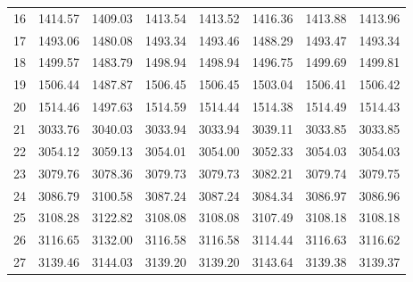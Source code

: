 \documentclass[10pt,oneside]{article}
\begin{document}
\begin{table}[h!]
\begin{tabular}{cccccccc}
16 &   1414.57 & 1409.03 & 1413.54 & 1413.52 &      1416.36 & 1413.88 & 1413.96 \\
17 &   1493.06 & 1480.08 & 1493.34 & 1493.46 &      1488.29 & 1493.47 & 1493.34 \\
18 &   1499.57 & 1483.79 & 1498.94 & 1498.94 &      1496.75 & 1499.69 & 1499.81 \\
19 &   1506.44 & 1487.87 & 1506.45 & 1506.45 &      1503.04 & 1506.41 & 1506.42 \\
20 &   1514.46 & 1497.63 & 1514.59 & 1514.44 &      1514.38 & 1514.49 & 1514.43 \\
21 &   3033.76 & 3040.03 & 3033.94 & 3033.94 &      3039.11 & 3033.85 & 3033.85 \\
22 &   3054.12 & 3059.13 & 3054.01 & 3054.00 &      3052.33 & 3054.03 & 3054.03 \\
23 &   3079.76 & 3078.36 & 3079.73 & 3079.73 &      3082.21 & 3079.74 & 3079.75 \\
24 &   3086.79 & 3100.58 & 3087.24 & 3087.24 &      3084.34 & 3086.97 & 3086.96 \\
25 &   3108.28 & 3122.82 & 3108.08 & 3108.08 &      3107.49 & 3108.18 & 3108.18 \\
26 &   3116.65 & 3132.00 & 3116.58 & 3116.58 &      3114.44 & 3116.63 & 3116.62 \\
27 &   3139.46 & 3144.03 & 3139.20 & 3139.20 &      3143.64 & 3139.38 & 3139.37 \\
\bottomrule
\end{tabular}
\end{table}

\clearpage
\end{document}
